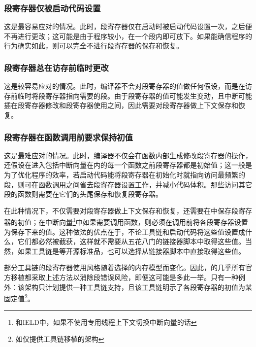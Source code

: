 \subsubsection{段寄存器仅被启动代码设置}\label{subsubsec:the-segment-register-is-set-only-by-startup-code}

这是最容易应对的情况。此时，段寄存器仅在启动时被启动代码设置一次，之后便不再进行更改；这可能是由于程序较小，在一个段内即可放下。如果能确信程序的行为确实如此，则可以完全不进行段寄存器的保存和恢复。

\subsubsection{段寄存器总在访存前临时更改}\label{subsubsec:the-segment-register-is-changed-temporarily-before-each-memory-access}

这是较容易应对的情况。此时，编译器不会对段寄存器的值做任何假设，而是在访存前临时将段寄存器指向需要的段。由于段寄存器的值可能发生变动，且中断可能插在段寄存器修改和段寄存器使用之间，因此需要对段寄存器做上下文保存和恢复。

\subsubsection{段寄存器在函数调用前要求保持初值}\label{subsubsec:the-segment-register-must-hold-its-initial-value-before-a-function-call}

这是最难应对的情况。此时，编译器不仅会在函数内部生成修改段寄存器的操作，还假设在进入包括中断向量在内的每一个函数之前段寄存器都是初始值；这一般是为了优化程序的效率，若启动代码能将段寄存器在初始化时就指向访问最频繁的段，则可在函数调用之间省去段寄存器设置工作，并减小代码体积。那些访问其它段的函数则需要在它们的头尾保存和恢复段寄存器。

在此种情况下，不仅需要对段寄存器做上下文保存和恢复，还需要在中保存段寄存器的初值；在中断向量\footnote{和IELD中，如果不使用专用线程上下文切换中断向量的话}中如果需要调用函数，则必须在调用前将各段寄存器设置为保存下来的值。这种做法的优点在于，不论工具链和启动代码将这些值设置成什么，它们都必然被截获，这样就不需要从五花八门的链接器脚本中取得这些值。当然，如果工具链是等开源标准品，也可以选择从链接器脚本中直接取得这些值。

部分工具链的段寄存器使用风格随着选择的内存模型而变化。因此，的几乎所有官方移植都采取上述方法以消除段错误风险，即便这可能是多此一举。只有一种例外：该架构只计划提供一种工具链支持，且该工具链明示了各段寄存器的初值为某固定值\footnote{如仅提供工具链移植的架构}。


